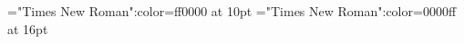 \documentclass[a4paper]{article}
\begin{document}
 
\pagestyle{plain} 
\font\a="Times New Roman":color=ff0000 at 10pt
\font\ba="Times New Roman":color=0000ff at 16pt

\pagestyle{fancy} 

\begin{comment}


\ba{class b}\end{comment}
 


\begin{comment}
\ba{class b}\end{comment}
\end{document}
